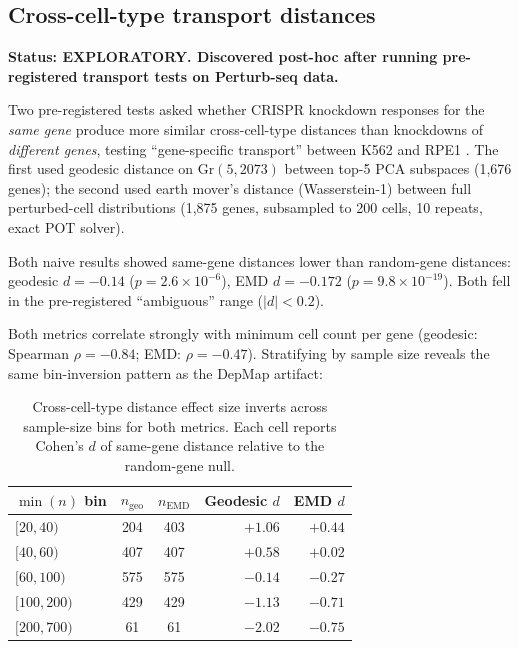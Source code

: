 \documentclass[11pt]{article}
\begin{document}
\subsection{Cross-cell-type transport distances}
\label{sec:ot_confound}

\textbf{Status: EXPLORATORY. Discovered post-hoc after running
pre-registered transport tests on Perturb-seq data.}

Two pre-registered tests asked whether CRISPR knockdown responses for
the \emph{same gene} produce more similar cross-cell-type distances
than knockdowns of \emph{different genes}, testing ``gene-specific
transport'' between K562 and RPE1 \citep{replogle2022mapping}.
The first used geodesic distance on $\text{Gr}(5, 2073)$ between
top-5 PCA subspaces (1{,}676 genes); the second used earth mover's
distance (Wasserstein-1) between full perturbed-cell distributions
(1{,}875 genes, subsampled to 200 cells, 10 repeats, exact POT solver).

Both naive results showed same-gene distances lower than random-gene
distances: geodesic $d = -0.14$ ($p = 2.6 \times 10^{-6}$), EMD
$d = -0.172$ ($p = 9.8 \times 10^{-19}$). Both fell in the
pre-registered ``ambiguous'' range ($|d| < 0.2$).

Both metrics correlate strongly with minimum cell count per gene
(geodesic: Spearman $\rho = -0.84$; EMD: $\rho = -0.47$). Stratifying
by sample size reveals the same bin-inversion pattern as the DepMap
artifact:

\begin{table}[h]
\centering
\caption{Cross-cell-type distance effect size inverts across
sample-size bins for both metrics. Each cell reports Cohen's $d$ of
same-gene distance relative to the random-gene null.}
\label{tab:transport_bins}
\begin{tabular}{lccrr}
\toprule
$\min(n)$ bin & $n_{\text{geo}}$ & $n_{\text{EMD}}$ & Geodesic $d$ & EMD $d$ \\
\midrule
$[20, 40)$   & 204 & 403  & $+1.06$ & $+0.44$ \\
$[40, 60)$   & 407 & 407  & $+0.58$ & $+0.02$ \\
$[60, 100)$  & 575 & 575  & $-0.14$ & $-0.27$ \\
$[100, 200)$ & 429 & 429  & $-1.13$ & $-0.71$ \\
$[200, 700)$ & 61  & 61   & $-2.02$ & $-0.75$ \\
\bottomrule
\end{tabular}
\end{table}
\end{document}
